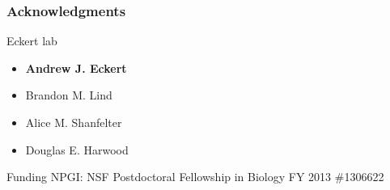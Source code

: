 \begin{frame}
\frametitle{Acknowledgments}
\begin{block}{Eckert lab}
\begin{itemize}
\item{\textbf{Andrew J. Eckert}}
\item{Brandon M. Lind}
\item{Alice M. Shanfelter}
\item{Douglas E. Harwood}
\end{itemize}
\end{block}

\begin{block}{Funding}
NPGI: NSF Postdoctoral Fellowship in Biology FY 2013 \#1306622
\end{block}

\end{frame}
